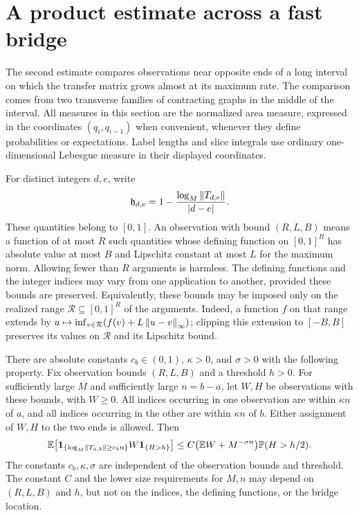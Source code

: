 \section{A product estimate across a fast bridge}
\label{bridge:section}

The second estimate compares observations near opposite ends of a long
interval on which the transfer matrix grows almost at its maximum rate.
The comparison comes from two transverse families of contracting graphs
in the middle of the interval. All measures in this section are the
normalized area measure, expressed in the coordinates
$(q_i,q_{i-1})$ when convenient, whenever they define probabilities
or expectations. Label lengths and slice integrals use ordinary
one-dimensional Lebesgue measure in their displayed coordinates.

For distinct integers $d,e$, write
\begin{equation}
 \mathfrak h_{d,e}
   =1-\frac{\log_M\left\lVert T_{d,e}\right\rVert}{\left\lvert d-e\right\rvert}.
 \label{bridge:shortfalls}
\end{equation}
These quantities belong to $[0,1]$. An observation with bound $(R,L,B)$
means a function of at most $R$ such quantities whose defining function
on $[0,1]^R$ has absolute value at most $B$ and Lipschitz constant at most
$L$ for the maximum norm. Allowing fewer than $R$ arguments is harmless.
The defining functions and the integer indices may vary from one
application to another, provided these bounds are preserved.
Equivalently, these bounds may be imposed only on the realized range
$\mathcal R\subseteq[0,1]^R$ of the arguments. Indeed, a function $f$
on that range extends by
$u\mapsto\inf_{v\in\mathcal R}(f(v)+L\left\lVert u-v\right\rVert_\infty)$;
clipping this extension to $[-B,B]$ preserves its values on
$\mathcal R$ and its Lipschitz bound.

\begin{theorem}
\label{bridge:theorem}
There are absolute constants $c_b\in(0,1)$, $\kappa>0$, and $\sigma>0$
with the following property. Fix observation bounds $(R,L,B)$ and a
threshold $h>0$. For sufficiently large $M$ and sufficiently large
$n=b-a$, let $W,H$ be observations with these bounds, with $W\geq0$.
All indices occurring in one observation are within $\kappa n$ of $a$,
and all indices occurring in the other are within $\kappa n$ of $b$.
Either assignment of $W,H$ to the two ends is allowed. Then
\begin{equation}
 \mathbb{E}\!\left[
   \mathbf{1}_{\{\log_M\left\lVert T_{a,b}\right\rVert\geq c_b n\}}
   W\mathbf{1}_{\{H>h\}}
 \right]
 \leq
 C\bigl(\mathbb{E} W+M^{-\sigma n}\bigr)\mathbb{P}(H>h/2).
 \label{bridge:product}
\end{equation}
The constants $c_b,\kappa,\sigma$ are independent of the observation
bounds and threshold. The constant $C$ and the lower size requirements
for $M,n$ may depend on $(R,L,B)$ and $h$, but not on the indices,
the defining functions, or the bridge location.
\end{theorem}

